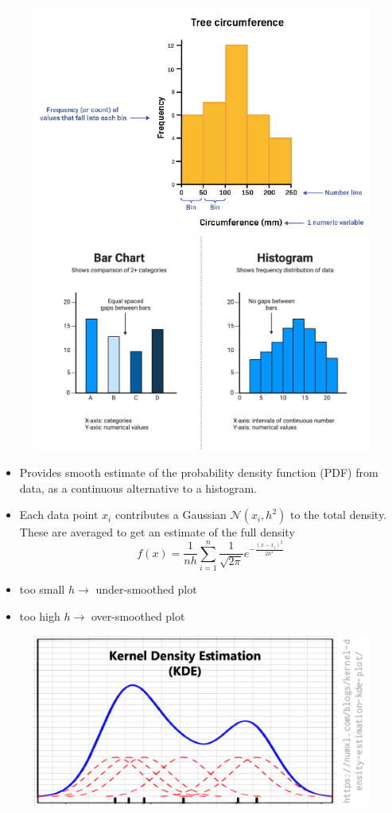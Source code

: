 \documentclass{article}
\begin{document}
\begin{figure}[H]
    \includegraphics[width=0.48\linewidth]{images/histogram.png}
    \includegraphics[width=0.48\linewidth]{images/histogram_vs_barchart.png}
\end{figure}

\begin{itemize}
    \item Provides smooth estimate of the probability density function (PDF) from data, as a continuous alternative to a histogram.
    \item Each data point $x_i$ contributes a Gaussian $\mathcal{N}(x_i, h^2)$ to the total density. These are averaged to get an estimate of the full density
    \[
    f(x) = \frac{1}{nh} \sum_{i=1}^n \frac{1}{\sqrt{2 \pi}} e^{-\frac{(x-x_i)^2}{2h^2}}
    \]
    \item too small $h \to$ under-smoothed plot
    \item too high $h \to$ over-smoothed plot
\end{itemize}
\begin{figure}[H]
    \includegraphics[width=0.5\linewidth]{images/kde.png}
\end{figure}
\end{document}
